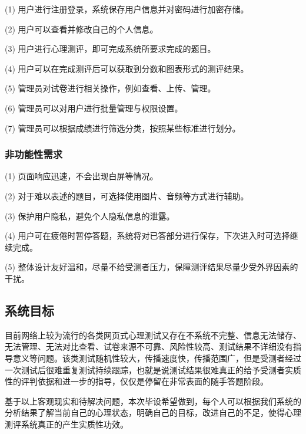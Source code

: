 (1) 用户进行注册登录，系统保存用户信息并对密码进行加密存储。

(2) 用户可以查看并修改自己的个人信息。

(3) 用户进行心理测评，即可完成系统所要求完成的题目。

(4) 用户可以在完成测评后可以获取到分数和图表形式的测评结果。

(5) 管理员对试卷进行相关操作，例如查看、上传、管理。

(6) 管理员可以对用户进行批量管理与权限设置。

(7) 管理员可以根据成绩进行筛选分类，按照某些标准进行划分。

\subsubsection{非功能性需求}

(1) 页面响应迅速，不会出现白屏等情况。

(2) 对于难以表述的题目，可选择使用图片、音频等方式进行辅助。

(3) 保护用户隐私，避免个人隐私信息的泄露。

(4) 用户可在疲倦时暂停答题，系统将对已答部分进行保存，下次进入时可选择继续完成。

(5) 整体设计友好温和，尽量不给受测者压力，保障测评结果尽量少受外界因素的干扰。

\subsection{系统目标}

目前网络上较为流行的各类网页式心理测试又存在不系统不完整、信息无法储存、无法管理、无法对比查看、试卷来源不可靠、风险性较高、测试结果不详细没有指导意义等问题。该类测试随机性较大，传播速度快，传播范围广，但是受测者经过一次测试后很难重复测试持续跟踪，也就是说测试结果很难真正的给予受测者实质性的评判依据和进一步的指导，仅仅是停留在非常表面的随手答题阶段。

基于以上客观现实和待解决问题，本次毕设希望做到，每个人可以根据我们系统的分析结果了解当前自己的心理状态，明确自己的目标，改进自己的不足，使得心理测评系统真正的产生实质性功效。